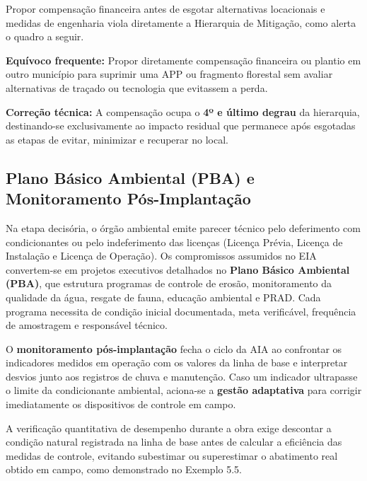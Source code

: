 Propor compensação financeira antes de esgotar alternativas locacionais e medidas de engenharia viola diretamente a Hierarquia de Mitigação, como alerta o quadro a seguir.

\begin{boxErro}
  \textbf{Equívoco frequente:} Propor diretamente compensação financeira ou plantio em outro município para suprimir uma APP ou fragmento florestal sem avaliar alternativas de traçado ou tecnologia que evitassem a perda.\par
  \textbf{Correção técnica:} A compensação ocupa o \textbf{4º e último degrau} da hierarquia, destinando-se exclusivamente ao impacto residual que permanece após esgotadas as etapas de evitar, minimizar e recuperar no local.
\end{boxErro}

\subsection{Plano Básico Ambiental (PBA) e Monitoramento Pós-Implantação}

Na etapa decisória, o órgão ambiental emite parecer técnico pelo deferimento com condicionantes ou pelo indeferimento das licenças (Licença Prévia, Licença de Instalação e Licença de Operação). Os compromissos assumidos no EIA convertem-se em projetos executivos detalhados no \textbf{Plano Básico Ambiental (PBA)}, que estrutura programas de controle de erosão, monitoramento da qualidade da água, resgate de fauna, educação ambiental e PRAD. Cada programa necessita de condição inicial documentada, meta verificável, frequência de amostragem e responsável técnico.

O \textbf{monitoramento pós-implantação} fecha o ciclo da AIA ao confrontar os indicadores medidos em operação com os valores da linha de base e interpretar desvios junto aos registros de chuva e manutenção. Caso um indicador ultrapasse o limite da condicionante ambiental, aciona-se a \textbf{gestão adaptativa} para corrigir imediatamente os dispositivos de controle em campo.


A verificação quantitativa de desempenho durante a obra exige descontar a condição natural registrada na linha de base antes de calcular a eficiência das medidas de controle, evitando subestimar ou superestimar o abatimento real obtido em campo, como demonstrado no Exemplo 5.5.

